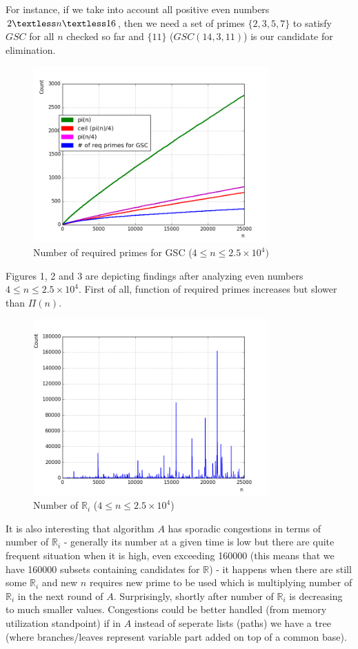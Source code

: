\documentclass[10pt,twocolumn]{article}
\begin{document}
For instance, if we take into account all positive even numbers $2 \textless n \textless 16$, then we need a set of primes $\{2,3,5,7\}$ to satisfy $GSC$ for all $n$ checked so far and $\{11\}$ ($GSC(14, 3, 11)$) is our candidate for elimination.	

\begin{figure}[!ht]
\centering
\captionsetup{justification=centering}
\includegraphics[width=9cm]{f_required_primes}
\caption[caption]{Number of required primes for GSC ($4 \leq n \leq 2.5 \times 10^4)$}
\label{fig:requiredprimes}
\end{figure}	

Figures 1, 2 and 3 are depicting findings after analyzing even numbers $4 \leq n \leq 2.5 \times 10^4$. First of all, function of required primes increases but slower than $\Pi(n)$.

\begin{figure}[!ht]
\centering
\captionsetup{justification=centering}
\includegraphics[width=9cm]{f_number_of_possible_sets}
\caption[caption]{Number of $\mathbb{R}_i$ ($4 \leq n \leq 2.5 \times 10^4$)}
\label{fig:numberofsets}
\end{figure}

It is also interesting that algorithm $A$ has sporadic congestions in terms of number of $\mathbb{R}_i$ - generally its number at a given time is low but there are quite frequent situation when it is high, even exceeding 160000 (this means that we have 160000 subsets containing candidates for $\mathbb{R}$) - it happens when there are still some $\mathbb{R}_i$ and new $n$ requires new prime to be used which is multiplying number of $\mathbb{R}_i$ in the next round of $A$. Surprisingly, shortly after number of $\mathbb{R}_i$ is decreasing to much smaller values. Congestions could be better handled (from memory utilization standpoint) if in $A$ instead of seperate lists (paths) we have a tree (where branches/leaves represent variable part added on top of a common base).
\end{document}
